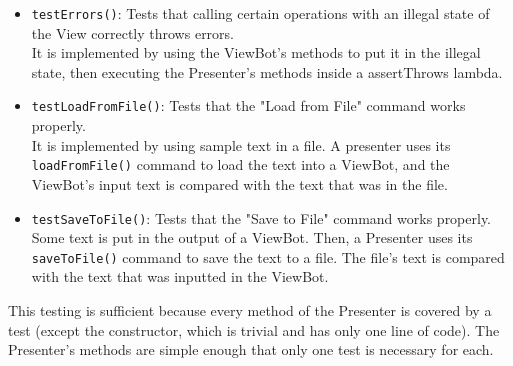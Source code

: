 \documentclass[11pt]{article}
\begin{document}
\begin{itemize}
\item \texttt{testErrors()}: Tests that calling certain operations with an illegal state of the View correctly throws errors.\\
It is implemented by using the ViewBot's methods to put it in the illegal state, then executing the Presenter's methods inside a assertThrows lambda.\\
\item \texttt{testLoadFromFile()}: Tests that the "Load from File" command works properly.\\
It is implemented by using sample text in a file.  A presenter uses its \texttt{loadFromFile()} command to load the text into a ViewBot, and the ViewBot's input text is compared with the text that was in the file.\\
\item \texttt{testSaveToFile()}: Tests that the "Save to File" command works properly.\\
Some text is put in the output of a ViewBot.  Then, a Presenter uses its \texttt{saveToFile()} command to save the text to a file.  The file's text is compared with the text that was inputted in the ViewBot.\\
\end{itemize}

This testing is sufficient because every method of the Presenter is covered by a test (except the constructor, which is trivial and has only one line of code).  The Presenter's methods are simple enough that only one test is necessary for each.\\
\end{document}
